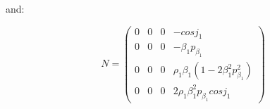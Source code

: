 \documentclass[methods.tex]{subfiles}
\begin{document}
and:

\begin{equation}
N = \begin{pmatrix}
0 & 0 & 0 & - cos j_1 \\
0 & 0 & 0 & - \beta_1 p_{\beta_1} \\
0 & 0 & 0 & \rho_1 \beta_1 (1 - 2 \beta_1^2 p_{\beta_1}^2) \\
0 & 0 & 0 & 2 \rho_1 \beta_1^2 p_{\beta_1} cos j_1
\end{pmatrix}
\end{equation}
\end{document}

